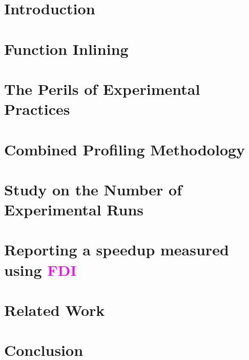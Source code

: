 \documentclass[conference]{IEEEtran}
\renewcommand{\ifColorText}[2]{\textcolor{#1}{#2}}  %
\def\FDI{{\ifColorText{Magenta}{FDI}}}
\begin{document}
\section{Introduction}
	\label{sec:intro}
	

\section{Function Inlining}
	\label{sec:inlining}
	

\section{The Perils of Experimental Practices}
	\label{sec:description}
	

\section{Combined Profiling Methodology}
	\label{sec:cmbprof}
	
	
\section{Study on the Number of Experimental Runs}
	\label{sec:robust}
	
	
\section{Reporting a speedup measured using \FDI\ }
	\label{sec:speedup}
	

\section{Related Work}
	\label{sec:related}
	

\section{Conclusion}
	\label{sec:conclusion}
	

%	

%


\end{document}
